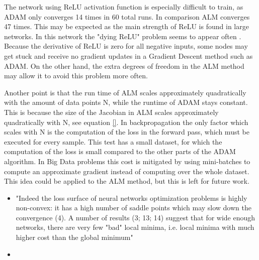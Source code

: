 The network using ReLU activation function is especially difficult to train, as ADAM only converges 14 times in 60 total runs. In comparison ALM converges 47 times. This may be expected as the main strength of ReLU is found in large networks. In this network the "dying ReLU" problem seems to appear often \cite{Lu2020}. Because the derivative of ReLU is zero for all negative inputs, some nodes may get stuck and receive no gradient updates in a Gradient Descent method such as ADAM. On the other hand, the extra degrees of freedom in the ALM method may allow it to avoid this problem more often.

Another point is that the run time of ALM scales approximately quadratically with the amount of data points N, while the runtime of ADAM stays constant. This is because the size of the Jacobian in ALM scales approximately quadratically with N, see equation \ref{}. In backpropagation the only factor which scales with N is the computation of the loss in the forward pass, which must be executed for every sample. This test has a small dataset, for which the computation of the loss is small compared to the other parts of the ADAM algorithm. In Big Data problems this cost is mitigated by using mini-batches to compute an approximate gradient instead of computing over the whole dataset. This idea could be applied to the ALM method, but this is left for future work.








\begin{itemize}
\item
\cite{jacot2020neural}
"Indeed
the loss surface of neural networks optimization problems is highly non-convex: it has a high number
of saddle points which may slow down the convergence (4). A number of results (3; 13; 14) suggest
that for wide enough networks, there are very few "bad" local minima, i.e. local minima with much
higher cost than the global minimum"
\item

\end{itemize}



